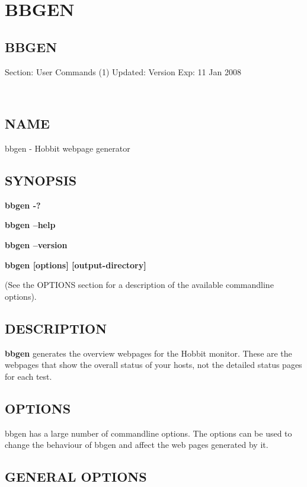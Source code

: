 \chapter{BBGEN}
\label{chap:bbgen}
\section{BBGEN}
 Section: User Commands (1) 
Updated: Version Exp: 11 Jan 2008 

~\cite{web:patchutils}

\section{NAME}
 bbgen - Hobbit webpage generator \section{SYNOPSIS}
\textbf{bbgen -?}
 
\textbf{bbgen --help}
 
\textbf{bbgen --version}
 
\textbf{bbgen [options] [output-directory]}
 
 (See the OPTIONS section for a description of the available commandline options). 

 
\section{DESCRIPTION}
\textbf{bbgen}
 generates the overview webpages for the Hobbit monitor. These are the
 webpages that show the overall status of your hosts, not the detailed
 status pages for each test. 


 
\section{OPTIONS}
 bbgen has a large number of commandline options. The options can be
 used to change the behaviour of bbgen and affect the web pages
 generated by it. 


 
\section{GENERAL OPTIONS}


